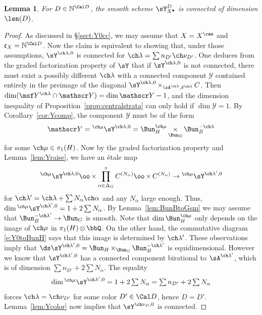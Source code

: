 \documentclass[final]{amsart}
\newtheorem{lem}[subsubsection]{Lemma}
\theoremstyle{remark}
\theoremstyle{definition}
\DeclareMathOperator*{\ot}{\otimes}
\DeclareMathOperator*{\xt}{\times}
\numberwithin{equation}{section}
\begin{document}
\begin{lem} \label{lem:oYconnected}
For $D \in \mathbb N^{\Cal D}$, 
the smooth scheme $\sY^{D}_{X^\bullet}$ is connected of dimension $\len(D)$.
\end{lem}
\begin{proof}
As discussed in \S\ref{sect:Y0cc}, we may assume that $X=X^\can$ and 
$\mathfrak c_X = \mathbb N^{\Cal D}$. 
Now the claim is equivalent to showing that, under those assumptions, 
$\sY^{\ch\lambda,0}$ is connected for $\ch\lambda = \sum n_{D'} \ch\nu_{D'}$. 
One deduces from the graded factorization property of $\sY$ that 
if $\sY^{\ch\lambda,0}$ is not connected, there must exist a possibly different $\ch\lambda$
with a connected component $\mathscr Y$ contained entirely in the preimage of the diagonal 
$\sY^{\ch\lambda,0} \xt_{\sA^{\ch\lambda}, \delta^{\ch\lambda}} C$. 
Then $\dim (\msf Y^{\ch\lambda} \cap \mathscr Y) = \dim \mathscr Y - 1$,
and the dimension inequality of Proposition~\ref{prop:centralstrata} can only hold if
$\dim \mathscr Y = 1$.
By Corollary~\ref{cor:Ycomp}, the component $\mathscr Y$ must be of the form 
\[ \mathscr Y = {^{\ch\mu}\sY^{\ch\lambda,0}} = 
\Bun_H^{\ch\mu} \xt_{\Bun_G} \Bun_B^{-\ch\lambda} \]
for some $\ch\mu\in \pi_1(H)$. 
Now by the graded factorization property and Lemma~\ref{lem:Yraise}, 
we have an \'etale map 
\[ ^{\ch\mu}\sY^{\ch\lambda,0} \oo\xt 
\prod^\circ_{\alpha\in\Delta_G} C^{(N_{\alpha})} \oo\xt C^{(N_{\alpha})} \to 
{^{\ch\mu}}\sY^{\ch\lambda',0} \]
for $\ch\lambda' = \ch\lambda + \sum N_\alpha\ch\alpha$ and any $N_\alpha$ large enough. 
Thus, $\dim {^{\ch\mu}}\sY^{\ch\lambda',0} = 1+2\sum N_\alpha$. 
By Lemma~\ref{lem:BunBtoGsm} we may assume that 
$\Bun_B^{-\ch\lambda'} \to \Bun_G$ is smooth. 
Note that $\dim \Bun_H^{\ch\mu}$ only depends on the image of $\ch\mu$ in $\pi_1(H)\ot \bbQ$. 
On the other hand, the commutative diagram \eqref{e:Y0toBunH} 
says that this image is determined by $\ch\lambda'$. 
These observations imply that $\ds \sY^{\ch\lambda',0}
= \Bun_H \xt_{\Bun_G} \Bun_B^{-\ch\lambda'}$ is equidimensional. 
However we know that $\sY^{\ch\lambda',0}$ has a connected component 
birational to $\sA^{\ch\lambda'}$, which is of dimension $\sum n_{D'} + 2\sum N_\alpha$.
The equality 
\[ \textstyle \dim {^{\ch\mu}}\sY^{\ch\lambda',0} = 1+2\sum N_\alpha = \sum n_{D'} + 2\sum N_\alpha \]
forces $\ch\lambda = \ch\nu_{D'}$ for some color $D'\in \Cal D$, hence $D=D'$.
Lemma~\ref{lem:Ycolor} now implies that $\sY^{\ch\nu_D,0}$ is connected.
\end{proof}
\end{document}
